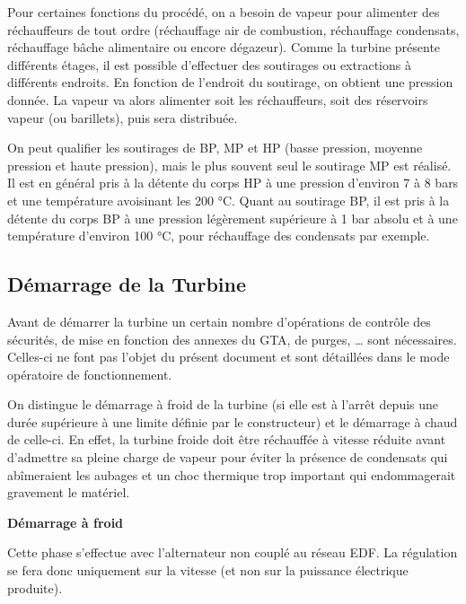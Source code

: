Pour certaines fonctions du procédé, on a besoin de vapeur pour alimenter des réchauffeurs de tout ordre (réchauffage air de combustion, réchauffage condensats, réchauffage bâche alimentaire ou encore dégazeur). Comme la turbine présente différents étages, il est possible d’effectuer des soutirages ou extractions à différents endroits. En fonction de l’endroit du soutirage, on obtient une pression donnée. La vapeur va alors alimenter soit les 
réchauffeurs, soit des réservoirs vapeur (ou barillets), puis sera distribuée.

On peut qualifier les soutirages de BP, MP et HP (basse pression, moyenne pression et haute pression), mais le plus souvent seul le soutirage MP est réalisé. Il est en général pris à la détente du corps HP à une pression d’environ 7 à 8 bars et une température avoisinant les 200 °C. Quant au soutirage BP, il est pris à la détente du corps BP à une pression légèrement supérieure à 1 bar absolu et à une température d’environ 100 °C, pour réchauffage des condensats par exemple.





\subsection{Démarrage de la Turbine}

Avant de démarrer la turbine un certain nombre d’opérations de contrôle des sécurités, de mise en fonction des annexes du GTA, de purges, … sont nécessaires. Celles-ci ne font pas l’objet du présent document et sont détaillées dans le mode opératoire de fonctionnement.

On distingue le démarrage à froid de la turbine (si elle est à l’arrêt depuis une durée supérieure à une limite définie par le constructeur) et le démarrage à chaud de celle-ci. En effet, la turbine froide doit être réchauffée à vitesse réduite avant d’admettre sa pleine charge de vapeur pour éviter la présence de condensats qui abîmeraient les aubages et un choc thermique trop important qui endommagerait gravement le matériel.


\vspace{0.3cm}
\textbf{Démarrage à froid}
\vspace{0.3cm}

Cette phase s’effectue avec l’alternateur non couplé au réseau EDF. La régulation se fera donc uniquement sur la vitesse (et non sur la puissance électrique produite).
\vspace{0.3cm}

